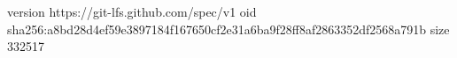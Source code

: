 version https://git-lfs.github.com/spec/v1
oid sha256:a8bd28d4ef59e3897184f167650cf2e31a6ba9f28ff8af2863352df2568a791b
size 332517
